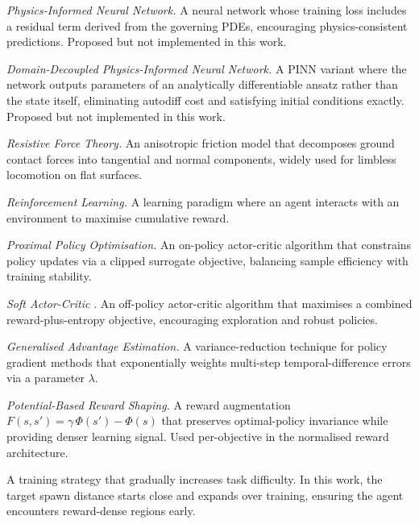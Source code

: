 \documentclass[11pt]{article}
\begin{document}
\begin{description}[style=nextline, leftmargin=3.2cm, labelwidth=3cm, font=\normalfont\bfseries]
  \item[PINN]
    \emph{Physics-Informed Neural Network.} A neural network whose training loss includes a residual term derived from the governing PDEs, encouraging physics-consistent predictions. Proposed but not implemented in this work.

  \item[DD-PINN]
    \emph{Domain-Decoupled Physics-Informed Neural Network.} A PINN variant where the network outputs parameters of an analytically differentiable ansatz rather than the state itself, eliminating autodiff cost and satisfying initial conditions exactly. Proposed but not implemented in this work.

  \item[RFT]
    \emph{Resistive Force Theory.} An anisotropic friction model that decomposes ground contact forces into tangential and normal components, widely used for limbless locomotion on flat surfaces.

  \item[RL]
    \emph{Reinforcement Learning.} A learning paradigm where an agent interacts with an environment to maximise cumulative reward.

  \item[PPO]
    \emph{Proximal Policy Optimisation.} An on-policy actor-critic algorithm that constrains policy updates via a clipped surrogate objective, balancing sample efficiency with training stability.

  \item[SAC]
    \emph{Soft Actor-Critic} \citep{Haarnoja2018}. An off-policy actor-critic algorithm that maximises a combined reward-plus-entropy objective, encouraging exploration and robust policies.

  \item[GAE]
    \emph{Generalised Advantage Estimation.} A variance-reduction technique for policy gradient methods that exponentially weights multi-step temporal-difference errors via a parameter $\lambda$.

  \item[PBRS]
    \emph{Potential-Based Reward Shaping.} A reward augmentation $F(s,s') = \gamma\,\Phi(s') - \Phi(s)$ that preserves optimal-policy invariance while providing denser learning signal. Used per-objective in the normalised reward architecture.

  \item[Curriculum learning]
    A training strategy that gradually increases task difficulty. In this work, the target spawn distance starts close and expands over training, ensuring the agent encounters reward-dense regions early.


\end{description}
\end{document}
